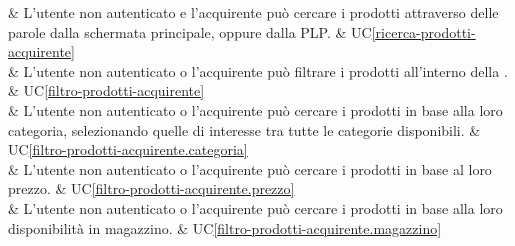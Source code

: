  & L'utente non autenticato e l'acquirente può cercare i prodotti attraverso delle parole dalla schermata principale, oppure dalla PLP. & UC\ref{ricerca-prodotti-acquirente} \\

 & L'utente non autenticato o l'acquirente può filtrare i prodotti all'interno della . & UC\ref{filtro-prodotti-acquirente} \\

 & L'utente non autenticato o l'acquirente può cercare i prodotti in base alla loro categoria, selezionando quelle di interesse tra tutte le categorie disponibili. & UC\ref{filtro-prodotti-acquirente.categoria} \\

 & L'utente non autenticato o l'acquirente può cercare i prodotti in base al loro prezzo. & UC\ref{filtro-prodotti-acquirente.prezzo} \\

 & L'utente non autenticato o l'acquirente può cercare i prodotti in base alla loro disponibilità in magazzino. & UC\ref{filtro-prodotti-acquirente.magazzino} \\
